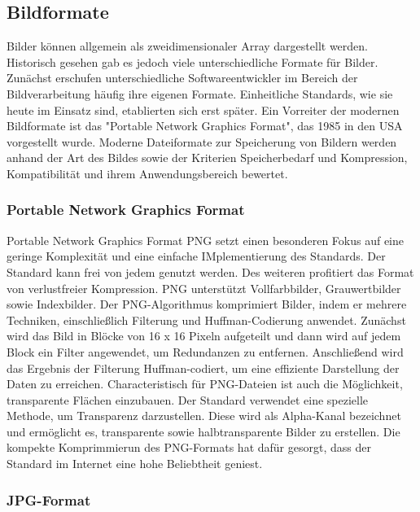 \subsection{Bildformate}
    Bilder können allgemein als zweidimensionaler Array dargestellt werden.
    Historisch gesehen gab es jedoch viele unterschiedliche Formate für Bilder. 
    Zunächst erschufen unterschiedliche Softwareentwickler im Bereich der Bildverarbeitung häufig ihre eigenen Formate.
    Einheitliche Standards, wie sie heute im Einsatz sind, etablierten sich erst später.
    Ein Vorreiter der modernen Bildformate ist das "Portable Network Graphics Format", das 1985 in den USA vorgestellt wurde. 
    Moderne Dateiformate zur Speicherung von Bildern werden anhand der Art des Bildes sowie der Kriterien Speicherbedarf und Kompression, Kompatibilität und ihrem Anwendungsbereich bewertet. 
    
    \subsubsection{Portable Network Graphics Format}
        Portable Network Graphics Format \ac{PNG} setzt einen besonderen Fokus auf eine geringe Komplexität und eine einfache IMplementierung des Standards. 
        Der Standard kann frei von jedem genutzt werden.
        Des weiteren profitiert das Format von verlustfreier Kompression. 
        PNG unterstützt Vollfarbbilder, Grauwertbilder sowie Indexbilder. 
        Der PNG-Algorithmus komprimiert Bilder, indem er mehrere Techniken, einschließlich Filterung und Huffman-Codierung anwendet. 
        Zunächst wird das Bild in Blöcke von 16 x 16 Pixeln aufgeteilt und dann wird auf jedem Block ein Filter angewendet, um Redundanzen zu entfernen. 
        Anschließend wird das Ergebnis der Filterung Huffman-codiert, um eine effiziente Darstellung der Daten zu erreichen.
        Characteristisch für PNG-Dateien ist auch die Möglichkeit, transparente Flächen einzubauen. 
        Der Standard verwendet eine spezielle Methode, um Transparenz darzustellen. 
        Diese wird als Alpha-Kanal bezeichnet und ermöglicht es, transparente sowie halbtransparente Bilder zu erstellen.
        Die kompekte Komprimmierun des PNG-Formats hat dafür gesorgt, dass der Standard im Internet eine hohe Beliebtheit geniest. 
    
    \subsubsection{JPG-Format}
        
